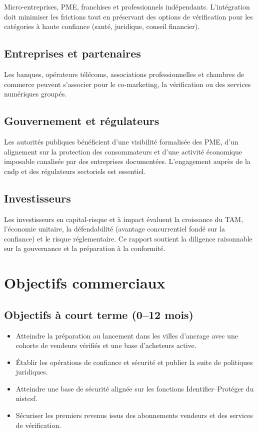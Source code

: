 Micro-entreprises, PME, franchises et professionnels indépendants. L'intégration doit minimiser les frictions tout en préservant des options de vérification pour les catégories à haute confiance (santé, juridique, conseil financier).

\subsection{Entreprises et partenaires}

Les banques, opérateurs télécoms, associations professionnelles et chambres de commerce peuvent s'associer pour le co-marketing, la vérification ou des services numériques groupés.

\subsection{Gouvernement et régulateurs}

Les autorités publiques bénéficient d'une visibilité formalisée des PME, d'un alignement sur la protection des consommateurs et d'une activité économique imposable canalisée par des entreprises documentées. L'engagement auprès de la \gls{cndp} et des régulateurs sectoriels est essentiel.

\subsection{Investisseurs}

Les investisseurs en capital-risque et à impact évaluent la croissance du TAM, l'économie unitaire, la défendabilité (avantage concurrentiel fondé sur la confiance) et le risque réglementaire. Ce rapport soutient la diligence raisonnable sur la gouvernance et la préparation à la conformité.


\section{Objectifs commerciaux}

\subsection{Objectifs à court terme (0--12 mois)}

\begin{itemize}
  \item Atteindre la préparation au lancement dans les villes d'ancrage avec une cohorte de vendeurs vérifiés et une base d'acheteurs active.
  \item Établir les opérations de confiance et sécurité et publier la suite de politiques juridiques.
  \item Atteindre une base de sécurité alignée sur les fonctions Identifier--Protéger du \gls{nistcsf}.
  \item Sécuriser les premiers revenus issus des abonnements vendeurs et des services de vérification.
\end{itemize}

